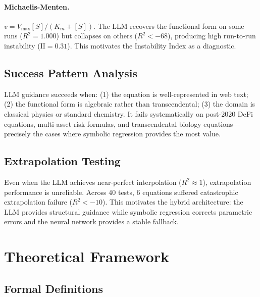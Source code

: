 \documentclass[twoside,11pt]{article}
\newcommand{\Rsq}{R^{2}}
\newcommand{\II}{\mathrm{II}}
\begin{document}
\paragraph{Michaelis-Menten.}
$v = V_{\max}[S]/(K_m + [S])$. The LLM recovers the functional form on some runs ($\Rsq = 1.000$) but collapses on others ($\Rsq < -68$), producing high run-to-run instability ($\II = 0.31$). This motivates the Instability Index as a diagnostic.

\subsection{Success Pattern Analysis}\label{subsec:success-pattern-analysis}
\label{sec:llm_success}

LLM guidance succeeds when: (1) the equation is well-represented in web text; (2) the functional form is algebraic rather than transcendental; (3) the domain is classical physics or standard chemistry. It fails systematically on post-2020 DeFi equations, multi-asset risk formulas, and transcendental biology equations---precisely the cases where symbolic regression provides the most value.

\subsection{Extrapolation Testing}\label{subsec:extrapolation-testing}
\label{sec:llm_extrap}

Even when the LLM achieves near-perfect interpolation ($\Rsq \approx 1$), extrapolation performance is unreliable. Across 40 tests, 6 equations suffered catastrophic extrapolation failure ($\Rsq < -10$). This motivates the hybrid architecture: the LLM provides structural guidance while symbolic regression corrects parametric errors and the neural network provides a stable fallback.

\section{Theoretical Framework}
\label{sec:theory}

\subsection{Formal Definitions}\label{subsec:formal-definitions}
\label{sec:theory_defs}
\end{document}
